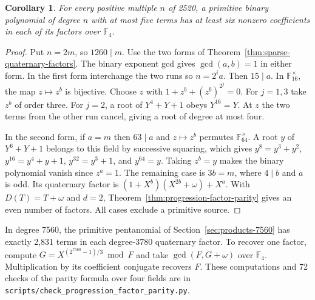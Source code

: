 \documentclass[11pt]{article}
\newtheorem{corollary}[theorem]{Corollary}
\begin{document}
\begin{corollary}\label{cor:quaternary-multiples}
For every positive multiple \(n\) of 2520, a primitive binary
polynomial of degree \(n\) with at most five terms has at least six
nonzero coefficients in each of its factors over \(\mathbb F_4\).
\end{corollary}
\begin{proof}
Put \(n=2m\), so \(1260\mid m\). Use the two forms of
Theorem~\ref{thm:sparse-quaternary-factors}. The binary exponent gcd
gives \(\gcd(a,b)=1\) in either form. In the first form interchange
the two runs so \(n=2^ia\). Then \(15\mid a\). In
\(\mathbb F_{16}^\times\), the map \(z\mapsto z^b\) is bijective.
Choose \(z\) with \(1+z^b+(z^b)^{2^j}=0\). For \(j=1,3\) take
\(z^b\) of order three. For \(j=2\), a root of \(Y^4+Y+1\) obeys
\(Y^{16}=Y\). At \(z\) the two terms from the other run cancel,
giving a root of degree at most four.

In the second form, if \(a=m\) then \(63\mid a\) and \(z\mapsto z^b\)
permutes \(\mathbb F_{64}^\times\). A root \(y\) of \(Y^6+Y+1\)
belongs to this field by successive squaring, which gives \(y^8=y^3+y^2\),
\(y^{16}=y^4+y+1\), \(y^{32}=y^3+1\), and \(y^{64}=y\).
Taking \(z^b=y\) makes the binary polynomial vanish since \(z^a=1\).
The remaining case is \(3b=m\), where \(4\mid b\) and \(a\) is odd.
Its quaternary factor is \((1+X^b)(X^{2b}+\omega)+X^a\). With
\(D(T)=T+\omega\) and \(d=2\), Theorem~\ref{thm:progression-factor-parity}
gives an even number of factors. All cases exclude a primitive source.
\end{proof}
In degree 7560, the primitive pentanomial of Section~\ref{sec:products-7560}
has exactly 2,831 terms in each degree-3780 quaternary factor. To recover
one factor, compute \(G=X^{(2^{7560}-1)/3}\bmod F\) and take
\(\gcd(F,G+\omega)\) over \(\mathbb F_4\). Multiplication by its
coefficient conjugate recovers \(F\). These computations and 72
checks of the parity formula over four fields are in
\nolinkurl{scripts/check_progression_factor_parity.py}.
\end{document}
